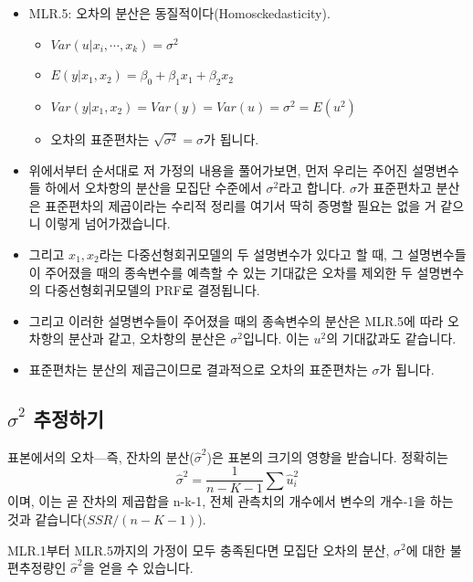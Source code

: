 \documentclass[
]{book}
\begin{document}
\begin{itemize}
\item
  MLR.5: 오차의 분산은 동질적이다(Homosckedasticity).

  \begin{itemize}
  \item
    \(Var(u|x_i, \cdots, x_k)=\sigma^2\)
  \item
    \(E(y|x_1, x_2) = \beta_0 + \beta_1x_1 + \beta_2x_2\)
  \item
    \(Var(y|x_1, x_2) = Var(y) = Var(u) = \sigma^2 = E(u^2)\)
  \item
    오차의 표준편차는 \(\sqrt{\sigma^2} = \sigma\)가 됩니다.
  \end{itemize}
\item
  위에서부터 순서대로 저 가정의 내용을 풀어가보면, 먼저 우리는 주어진 설명변수들 하에서 오차항의 분산을 모집단 수준에서 \(\sigma^2\)라고 합니다. \(\sigma\)가 표준편차고 분산은 표준편차의 제곱이라는 수리적 정리를 여기서 딱히 증명할 필요는 없을 거 같으니 이렇게 넘어가겠습니다.
\item
  그리고 \(x_1, x_2\)라는 다중선형회귀모델의 두 설명변수가 있다고 할 때, 그 설명변수들이 주어졌을 때의 종속변수를 예측할 수 있는 기대값은 오차를 제외한 두 설명변수의 다중선형회귀모델의 PRF로 결정됩니다.
\item
  그리고 이러한 설명변수들이 주어졌을 때의 종속변수의 분산은 MLR.5에 따라 오차항의 분산과 같고, 오차항의 분산은 \(\sigma^2\)입니다. 이는 \(u^2\)의 기대값과도 같습니다.
\item
  표준편차는 분산의 제곱근이므로 결과적으로 오차의 표준편차는 \(\sigma\)가 됩니다.
\end{itemize}

\hypertarget{hatsigma2-uxcd94uxc815uxd558uxae30}{%
\subsection{\texorpdfstring{\(\hat{\sigma}^2\) 추정하기}{\textbackslash hat\{\textbackslash sigma\}\^{}2 추정하기}}\label{hatsigma2-uxcd94uxc815uxd558uxae30}}

표본에서의 오차---즉, 잔차의 분산(\(\hat{\sigma}^2\))은 표본의 크기의 영향을 받습니다. 정확히는 \[\hat{\sigma}^2=\frac{1}{n-K-1}\sum\hat{u}^2_i\]이며, 이는 곧 잔차의 제곱합을 n-k-1, 전체 관측치의 개수에서 변수의 개수-1을 하는 것과 같습니다(\(SSR/(n-K-1)\)).

MLR.1부터 MLR.5까지의 가정이 모두 충족된다면 모집단 오차의 분산, \(\sigma^2\)에 대한 불편추정량인 \(\hat{\sigma}^2\)을 얻을 수 있습니다.
\end{document}

